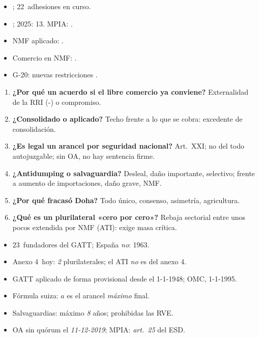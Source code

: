 \documentclass{article}
\begin{document}
\begin{columnas}
\anexorepaso
{}
\begin{itemize}
\item {}; 22~adhesiones en curso.
\item {}; 2025: 13. MPIA: .
\item NMF aplicado: .
\item Comercio en NMF: .
\item G-20: nuevas restricciones .
\end{itemize}
\begin{enumerate}
\item \textbf{¿Por qué un acuerdo si el libre comercio ya conviene?} Externalidad de la RRI (-) o compromiso.
\item \textbf{¿Consolidado o aplicado?} Techo frente a lo que se cobra: excedente de consolidación.
\item \textbf{¿Es legal un arancel por seguridad nacional?} Art.~XXI; no del todo autojuzgable; sin OA, no hay sentencia firme.
\item \textbf{¿Antidumping o salvaguardia?} Desleal, daño importante, selectivo; frente a aumento de importaciones, daño grave, NMF.
\item \textbf{¿Por qué fracasó Doha?} Todo único, consenso, asimetría, agricultura.
\item \textbf{¿Qué es un plurilateral «cero por cero»?} Rebaja sectorial entre unos pocos extendida por NMF (ATI): exige masa crítica.
\end{enumerate}
\begin{trampa}
\begin{itemize}
\item 23~fundadores del GATT; España \emph{no}: 1963.
\item Anexo 4~hoy: \emph{2} plurilaterales; el ATI \emph{no} es del anexo 4.
\item GATT aplicado de forma provisional desde el 1-1-1948; OMC, 1-1-1995.
\item Fórmula suiza: $a$ es el arancel \emph{máximo} final.
\item Salvaguardias: máximo \emph{8} años; prohibidas las RVE.
\item OA sin quórum el \emph{11-12-2019}; MPIA: \emph{art.~25} del ESD.
\end{itemize}
\end{trampa}

\end{columnas}
\end{document}
